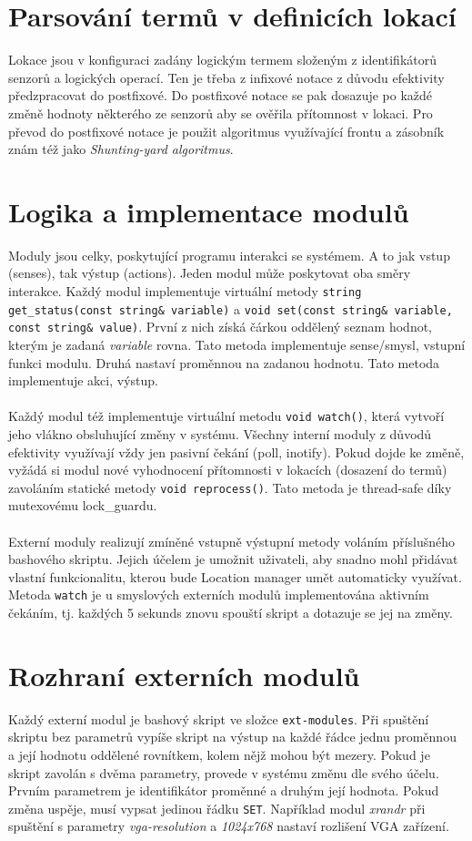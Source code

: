 \documentclass[10pt,a4paper]{article}
\begin{document}
\section*{Parsování termů v definicích lokací}
Lokace jsou v konfiguraci zadány logickým termem složeným z identifikátorů senzorů a logických operací. Ten je třeba z infixové notace z důvodu efektivity předzpracovat do postfixové. Do postfixové notace se pak dosazuje po každé změně hodnoty některého ze senzorů aby se ověřila přítomnost v lokaci. Pro převod do postfixové notace je použit algoritmus využívající frontu a zásobník znám též jako {\it Shunting-yard algoritmus}. \\

\section*{Logika a implementace modulů}
Moduly jsou celky, poskytující programu interakci se systémem. A to jak vstup (senses), tak výstup (actions). Jeden modul může poskytovat oba směry interakce. Každý modul implementuje virtuální metody \texttt{string get\_status(const string\& variable)} a \texttt{void set(const string\& variable, const string\& value)}. První z nich získá čárkou oddělený seznam hodnot, kterým je zadaná {\it variable} rovna. Tato metoda implementuje sense/smysl, vstupní funkci modulu. Druhá nastaví proměnnou na zadanou hodnotu. Tato metoda implementuje akci, výstup. \\
\\
Každý modul též implementuje virtuální metodu \texttt{void watch()}, která vytvoří jeho vlákno obsluhující změny v systému. Všechny interní moduly z důvodů efektivity využívají vždy jen pasivní čekání (poll, inotify). Pokud dojde ke změně, vyžádá si modul nové vyhodnocení přítomnosti v lokacích (dosazení do termů) zavoláním statické metody \texttt{void reprocess()}. Tato metoda je thread-safe díky mutexovému lock\_guardu. \\
\\
Externí moduly realizují zmíněné vstupně výstupní metody voláním příslušného bashového skriptu. Jejich účelem je umožnit uživateli, aby snadno mohl přidávat vlastní funkcionalitu, kterou bude Location manager umět automaticky využívat. Metoda \texttt{watch} je u smyslových externích modulů implementována aktivním čekáním, tj. každých 5 sekunds znovu spouští skript a dotazuje se jej na změny. \\

\section*{Rozhraní externích modulů}
Každý externí modul je bashový skript ve složce \texttt{ext-modules}. Při spuštění skriptu bez parametrů vypíše skript na výstup na každé řádce jednu proměnnou a její hodnotu oddělené rovnítkem, kolem nějž mohou být mezery. Pokud je skript zavolán s dvěma parametry, provede v systému změnu dle svého účelu. Prvním parametrem je identifikátor proměnné a druhým její hodnota. Pokud změna uspěje, musí vypsat jedinou řádku \texttt{SET}. Například modul {\it xrandr} při spuštění s parametry {\it vga-resolution} a {\it 1024x768} nastaví rozlišení VGA zařízení. \\
\end{document}
